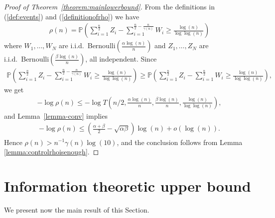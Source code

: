 \documentclass[english]{article}
\newcommand{\1}{\textbf{1}}
\newcommand{\pp}{\frac{\alpha\log(n)}{n}}
\newcommand{\qq}{\frac{\beta\log(n)}{n}}
\newcommand{\p}{\mathbb{P}}
\begin{document}
\begin{proof}[Proof of Theorem~\ref{theorem:mainlowerbound}]
From the definitions in (\ref{def:events}) and (\ref{definitionofrho}) we have 
\begin{align}
\rho(n)=\p\left( \sum_{i=1}^{\frac{n}2} Z_i -  \sum_{i=1}^{\frac{n}2- \frac{n}{\gamma(n)}} W_i \geq \frac{\log(n)}{\log\log(n)} \right) 
\end{align}
where $W_1,\dots, W_N$ are i.i.d.\ Bernoulli$\left(\pp \right)$ and $Z_1,\dots, Z_N$ are i.i.d.\ Bernoulli$\left(\qq \right)$, all independent.
Since
\begin{align}
\p\left( \sum_{i=1}^{\frac{n}2} Z_i -  \sum_{i=1}^{\frac{n}2- \frac{n}{\gamma(n)}} W_i \geq \frac{\log(n)}{\log\log(n)} \right) \geq \p\left( \sum_{i=1}^{\frac{n}2} Z_i -  \sum_{i=1}^{\frac{n}2} W_i \geq \frac{\log(n)}{\log\log(n)} \right) ,
\end{align}
we get
\begin{align}
- \log \rho(n) \leq - \log T \left(n/2, \pp, \qq, \frac{\log(n)}{\log\log(n)}\right),
\end{align}
and Lemma~\ref{lemma-conv} implies 
\begin{align}
- \log \rho(n) \leq  \left( \frac{\alpha + \beta}2 - \sqrt{\alpha \beta} \right) \log(n) + o(\log(n)).
\end{align}
Hence $\rho(n) > n^{-1}\gamma(n)\log(10)$, and the conclusion follows from Lemma \ref{lemma:controlrhoisenough}.
\end{proof}


































\section{Information theoretic upper bound}



We present now the main result of this Section.
\end{document}
